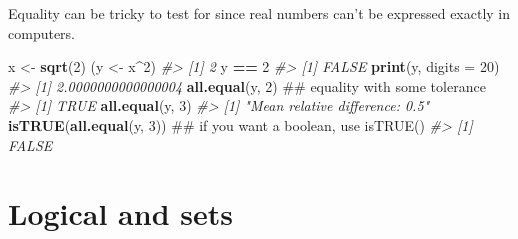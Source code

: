 \documentclass[]{book}
\newenvironment{Shaded}{\begin{snugshade}}{\end{snugshade}}
\newcommand{\KeywordTok}[1]{\textcolor[rgb]{0.13,0.29,0.53}{\textbf{#1}}}
\newcommand{\DataTypeTok}[1]{\textcolor[rgb]{0.13,0.29,0.53}{#1}}
\newcommand{\DecValTok}[1]{\textcolor[rgb]{0.00,0.00,0.81}{#1}}
\newcommand{\StringTok}[1]{\textcolor[rgb]{0.31,0.60,0.02}{#1}}
\newcommand{\CommentTok}[1]{\textcolor[rgb]{0.56,0.35,0.01}{\textit{#1}}}
\newcommand{\OtherTok}[1]{\textcolor[rgb]{0.56,0.35,0.01}{#1}}
\newcommand{\OperatorTok}[1]{\textcolor[rgb]{0.81,0.36,0.00}{\textbf{#1}}}
\newcommand{\NormalTok}[1]{#1}
\begin{document}
Equality can be tricky to test for since real numbers can't be expressed
exactly in computers.

\begin{Shaded}
\begin{Highlighting}[]
\NormalTok{x <-}\StringTok{ }\KeywordTok{sqrt}\NormalTok{(}\DecValTok{2}\NormalTok{)}
\NormalTok{(y <-}\StringTok{ }\NormalTok{x}\OperatorTok{^}\DecValTok{2}\NormalTok{)}
\CommentTok{#> [1] 2}
\NormalTok{y }\OperatorTok{==}\StringTok{ }\DecValTok{2}
\CommentTok{#> [1] FALSE}
\KeywordTok{print}\NormalTok{(y, }\DataTypeTok{digits =} \DecValTok{20}\NormalTok{)}
\CommentTok{#> [1] 2.0000000000000004}
\KeywordTok{all.equal}\NormalTok{(y, }\DecValTok{2}\NormalTok{)          ## equality with some tolerance}
\CommentTok{#> [1] TRUE}
\KeywordTok{all.equal}\NormalTok{(y, }\DecValTok{3}\NormalTok{)}
\CommentTok{#> [1] "Mean relative difference: 0.5"}
\KeywordTok{isTRUE}\NormalTok{(}\KeywordTok{all.equal}\NormalTok{(y, }\DecValTok{3}\NormalTok{))  ## if you want a boolean, use isTRUE()}
\CommentTok{#> [1] FALSE}
\end{Highlighting}
\end{Shaded}

\section{Logical and sets}\label{logical-and-sets}

\begin{Shaded}
\end{Shaded}
\end{document}
